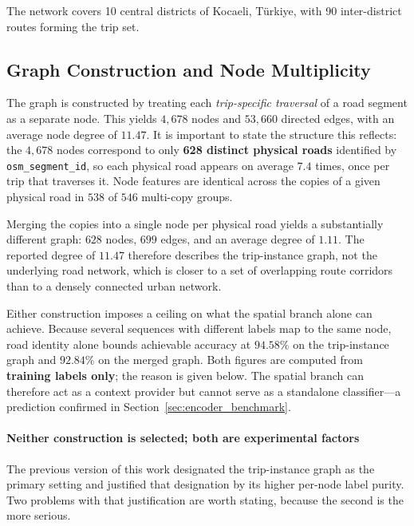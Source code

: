 \documentclass[journal]{IEEEtran}
\begin{document}
The network covers 10 central districts of Kocaeli, Türkiye, with 90 inter-district routes forming the trip set.

\subsection{Graph Construction and Node Multiplicity}
\label{sec:graph_construction}
The graph is constructed by treating each \emph{trip-specific traversal} of a road segment as a separate node. This yields $4{,}678$ nodes and $53{,}660$ directed edges, with an average node degree of $11.47$. It is important to state the structure this reflects: the $4{,}678$ nodes correspond to only \textbf{628 distinct physical roads} identified by \texttt{osm\_segment\_id}, so each physical road appears on average $7.4$ times, once per trip that traverses it. Node features are identical across the copies of a given physical road in $538$ of $546$ multi-copy groups.

Merging the copies into a single node per physical road yields a substantially different graph: $628$ nodes, $699$ edges, and an average degree of $1.11$. The reported degree of $11.47$ therefore describes the trip-instance graph, not the underlying road network, which is closer to a set of overlapping route corridors than to a densely connected urban network.

Either construction imposes a ceiling on what the spatial branch alone can achieve. Because several sequences with different labels map to the same node, road identity alone bounds achievable accuracy at $94.58\%$ on the trip-instance graph and $92.84\%$ on the merged graph. Both figures are computed from \textbf{training labels only}; the reason is given below. The spatial branch can therefore act as a context provider but cannot serve as a standalone classifier---a prediction confirmed in Section~\ref{sec:encoder_benchmark}.

\paragraph{Neither construction is selected; both are experimental factors}
The previous version of this work designated the trip-instance graph as the primary setting and justified that designation by its higher per-node label purity. Two problems with that justification are worth stating, because the second is the more serious.
\end{document}
